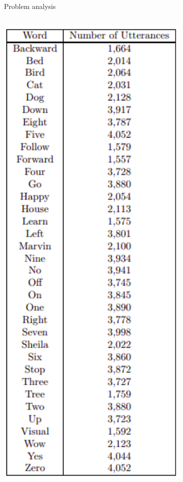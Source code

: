 \begin{frame}{Problem analysis}
\begin{columns}
  \begin{column}{0.3\textwidth}
    \includegraphics[width=0.7\textwidth]{figure/speech-command-info.png}
  \end{column}
\end{columns}
\end{frame}


